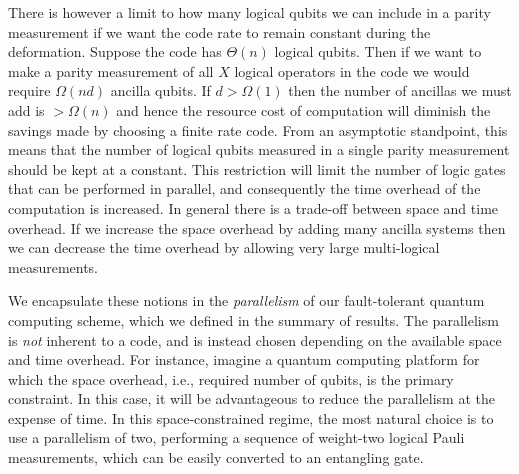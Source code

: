 \documentclass[reprint,
superscriptaddress,
 amsmath,amssymb,
 aps, longbibliography
]{revtex4-1}
\begin{document}
There is however a limit to how many logical qubits we can include in a parity measurement if we want the code rate to remain constant during the deformation. Suppose the code has $\Theta(n)$ logical qubits. Then if we want to make a parity measurement of all $X$ logical operators in the code we would require $\Omega(nd)$ ancilla qubits. If $d > \Omega(1)$ then the number of ancillas we must add is $> \Omega(n)$ and hence the resource cost of computation will diminish the savings made by choosing a finite rate code. From an asymptotic standpoint, this means that the number of logical qubits measured in a single parity measurement should be kept at a constant.  This restriction will limit the number of logic gates that can be performed in parallel, and consequently the time overhead of the computation is increased. In general there is a trade-off between space and time overhead. If we increase the space overhead by adding many ancilla systems then we can decrease the time overhead by allowing very large multi-logical measurements. 

We encapsulate these notions in the \emph{parallelism} of our fault-tolerant quantum computing scheme, which we defined in the summary of results. The parallelism is \emph{not} inherent to a code, and is instead chosen depending on the available space and time overhead. For instance, imagine a quantum computing platform for which the space overhead, i.e., required number of qubits, is the primary constraint. In this case, it will be advantageous to reduce the parallelism at the expense of time. In this space-constrained regime, the most natural choice is to use a parallelism of two, performing a sequence of weight-two logical Pauli measurements, which can be easily converted to an entangling gate.
\end{document}

